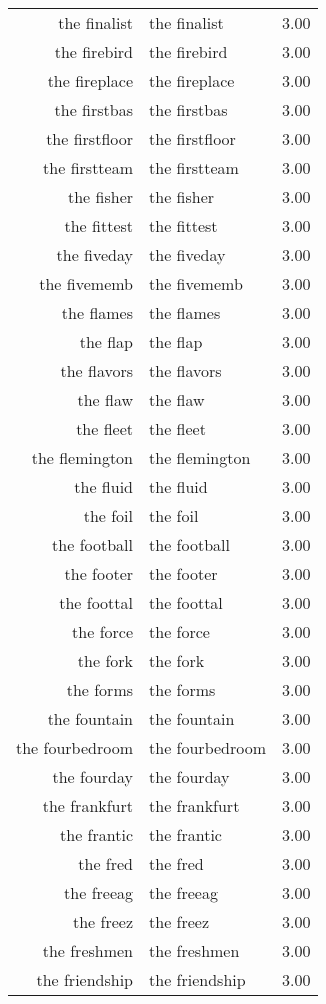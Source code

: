 \begin{table}[ht]
\begin{tabular}{rlr}
  the finalist & the finalist & 3.00 \\ 
  the firebird & the firebird & 3.00 \\ 
  the fireplace & the fireplace & 3.00 \\ 
  the firstbas & the firstbas & 3.00 \\ 
  the firstfloor & the firstfloor & 3.00 \\ 
  the firstteam & the firstteam & 3.00 \\ 
  the fisher & the fisher & 3.00 \\ 
  the fittest & the fittest & 3.00 \\ 
  the fiveday & the fiveday & 3.00 \\ 
  the fivememb & the fivememb & 3.00 \\ 
  the flames & the flames & 3.00 \\ 
  the flap & the flap & 3.00 \\ 
  the flavors & the flavors & 3.00 \\ 
  the flaw & the flaw & 3.00 \\ 
  the fleet & the fleet & 3.00 \\ 
  the flemington & the flemington & 3.00 \\ 
  the fluid & the fluid & 3.00 \\ 
  the foil & the foil & 3.00 \\ 
  the football & the football & 3.00 \\ 
  the footer & the footer & 3.00 \\ 
  the foottal & the foottal & 3.00 \\ 
  the force & the force & 3.00 \\ 
  the fork & the fork & 3.00 \\ 
  the forms & the forms & 3.00 \\ 
  the fountain & the fountain & 3.00 \\ 
  the fourbedroom & the fourbedroom & 3.00 \\ 
  the fourday & the fourday & 3.00 \\ 
  the frankfurt & the frankfurt & 3.00 \\ 
  the frantic & the frantic & 3.00 \\ 
  the fred & the fred & 3.00 \\ 
  the freeag & the freeag & 3.00 \\ 
  the freez & the freez & 3.00 \\ 
  the freshmen & the freshmen & 3.00 \\ 
  the friendship & the friendship & 3.00 \\ 

\end{tabular}
\end{table}
